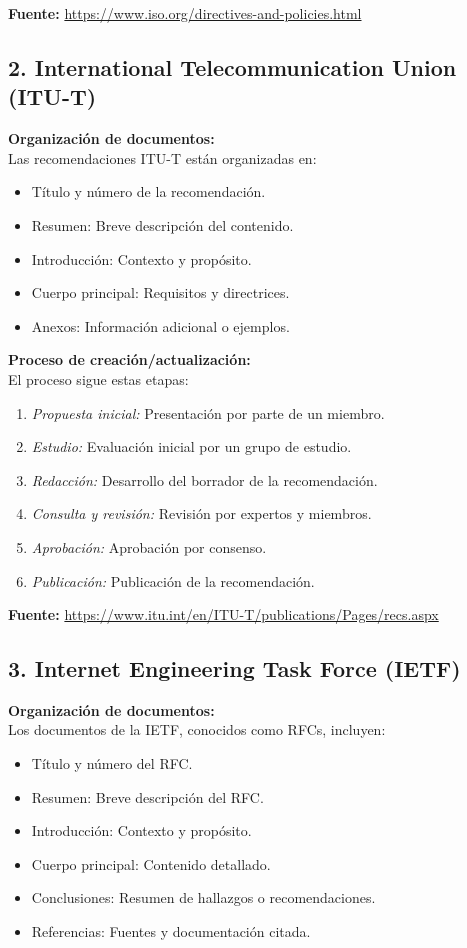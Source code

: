 \documentclass[12pt]{report}
\begin{document}
\textbf{Fuente:} \url{https://www.iso.org/directives-and-policies.html}

\subsection*{2. International Telecommunication Union (ITU-T)}

\textbf{Organización de documentos:} \\
Las recomendaciones ITU-T están organizadas en:
\begin{itemize}
	\item Título y número de la recomendación.
	\item Resumen: Breve descripción del contenido.
	\item Introducción: Contexto y propósito.
	\item Cuerpo principal: Requisitos y directrices.
	\item Anexos: Información adicional o ejemplos.
\end{itemize}

\textbf{Proceso de creación/actualización:} \\
El proceso sigue estas etapas:
\begin{enumerate}
	\item \textit{Propuesta inicial:} Presentación por parte de un miembro.
	\item \textit{Estudio:} Evaluación inicial por un grupo de estudio.
	\item \textit{Redacción:} Desarrollo del borrador de la recomendación.
	\item \textit{Consulta y revisión:} Revisión por expertos y miembros.
	\item \textit{Aprobación:} Aprobación por consenso.
	\item \textit{Publicación:} Publicación de la recomendación.
\end{enumerate}

\textbf{Fuente:} \url{https://www.itu.int/en/ITU-T/publications/Pages/recs.aspx}

\subsection*{3. Internet Engineering Task Force (IETF)}

\textbf{Organización de documentos:} \\
Los documentos de la IETF, conocidos como RFCs, incluyen:
\begin{itemize}
	\item Título y número del RFC.
	\item Resumen: Breve descripción del RFC.
	\item Introducción: Contexto y propósito.
	\item Cuerpo principal: Contenido detallado.
	\item Conclusiones: Resumen de hallazgos o recomendaciones.
	\item Referencias: Fuentes y documentación citada.
\end{itemize}
\end{document}
